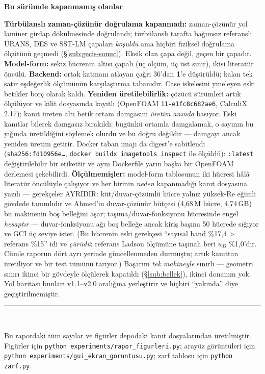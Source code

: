 \documentclass[11pt,a4paper]{article}
\newcommand{\kkkenar}{lacivert}
\newcommand{\kkzemin}{kod}
\newenvironment{renkkutu}[3]{%
  \renewcommand{\kkkenar}{#1}\renewcommand{\kkzemin}{#2}%
  \par\medskip\noindent
  \begin{lrbox}{\kutugovde}%
  \begin{minipage}{\dimexpr\linewidth-2\fboxsep-2\fboxrule\relax}\footnotesize
  \textcolor{#1}{\textbf{#3}}\par\vspace{3pt}%
}{%
  \end{minipage}%
  \end{lrbox}%
  \noindent\fcolorbox{\kkkenar}{\kkzemin}{\usebox{\kutugovde}}%
  \par\medskip
}
\newenvironment{dikkat}[1]{\begin{renkkutu}{orta}{ortabg}{#1}}{\end{renkkutu}}
\begin{document}
\begin{dikkat}{Bu sürümde kapanmamış olanlar}
\textbf{Türbülanslı zaman-çözünür doğrulama kapanmadı:} zaman-çözünür yol
laminer girdap dökülmesinde doğrulandı; türbülanslı tarafta bağımsız
referanslı URANS, DES ve SST-LM çapaları \emph{koşuldu} ama hiçbiri
fiziksel doğrulama ölçütünü geçmedi (\S\ref{sub:gecis-sonuc}). Eksik olan
çapa değil, geçen bir çapadır.
\textbf{Model-form:} sekiz hücrenin altısı çapalı (üç ölçüm, üç üst sınır),
ikisi literatür öncülü. \textbf{Backend:} ortak katmanı atlayan çağrı 36'dan \textbf{1}'e
düşürüldü; kalan tek satır eşdeğerlik ölçümünün karşılaştırma tabanıdır. Case
iskelesini yineleyen eski betikler borç olarak kaldı. \textbf{Yeniden üretilebilirlik:} çözücü sürümleri artık ölçülüyor ve
kilit dosyasında kayıtlı (OpenFOAM \texttt{11-e1fc8c682ae6}, CalculiX 2.17);
kanıt üreten altı betik ortam damgasını \emph{üretim anında} basıyor. Eski
kanıtlar bilerek damgasız bırakıldı: bugünkü ortamla damgalamak, o sayının bu
yığında üretildiğini söylemek olurdu ve bu doğru değildir --- damgayı ancak
yeniden üretim getirir. Docker taban imajı da digest'e sabitlendi
(\texttt{sha256:fd10956e\dots}, \texttt{docker buildx imagetools inspect} ile
ölçüldü): \texttt{:latest} değiştirilebilir bir etikettir ve aynı Dockerfile
yarın başka bir OpenFOAM derlemesi çekebilirdi.
\textbf{Ölçülmemişler:} model-form tablosunun iki hücresi hâlâ literatür
öncülüyle çalışıyor ve her birinin \emph{neden} kapanmadığı kanıt dosyasına
yazılı --- gerekçeler AYRIDIR: küt/duvar-çözümlü hücre yalnız yüksek-Re eğimli
gövdede tanımlıdır ve Ahmed'in duvar-çözünür bütçesi (4{,}68\,M hücre,
4{,}74\,GB) bu makinenin boş belleğini aşar; taşıma/duvar-fonksiyonu hücresinde
engel \emph{hesaptır} --- duvar-fonksiyonu ağı boş belleğe ancak kiriş başına
50 hücrede sığıyor ve GCI üç seviye ister. (Bu hücrenin eski gerekçesi
``sayısal band \%17{,}4 > referans \%15'' idi ve \emph{çürüdü}: referans Ladson
ölçümüne taşınalı beri $u_D$ \%1{,}0'dır. Cümle raporun dört ayrı yerinde
güncellenmeden durmuştu; artık kanıttan üretiliyor ve bir test tümünü
tarıyor.) Başarım \emph{tek makineyle}
sınırlı --- geometri sınırı ikinci bir gövdeyle ölçülerek kapatıldı
(\S\ref{sub:bellek}), ikinci donanım yok. Yol
haritası bunları v1.1--v2.0 aralığına yerleştirir ve hiçbiri ``yakında'' diye
geçiştirilmemiştir.
\end{dikkat}

\vspace{4mm}
\noindent\rule{\textwidth}{0.4pt}\\[1mm]
\begin{sloppypar}
{\footnotesize Bu rapordaki tüm sayılar ve figürler depodaki kanıt
dosyalarından üretilmiştir. Figürler için
\texttt{python experiments/rapor\_figurleri.py}; arayüz görüntüleri için
\texttt{python experiments/gui\_ekran\_goruntusu.py}; zarf tablosu için
\texttt{python zarf.py}.\par}
\end{sloppypar}
\end{document}
